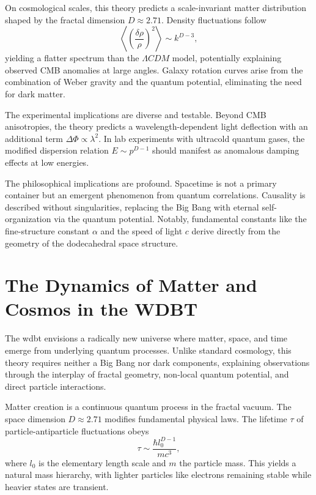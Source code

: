 On cosmological scales, this theory predicts a scale-invariant matter distribution shaped by the fractal dimension $D \approx 2.71$. Density fluctuations follow
\begin{equation}
    \left\langle \left( \frac{\delta \rho}{\rho} \right)^2 \right\rangle \sim k^{D-3},
\end{equation}
yielding a flatter spectrum than the $\varLambda CDM$ model, potentially explaining observed CMB anomalies at large angles. Galaxy rotation curves arise from the combination of Weber gravity and the quantum potential, eliminating the need for dark matter.

The experimental implications are diverse and testable. Beyond CMB anisotropies, the theory predicts a wavelength-dependent light deflection with an additional term $\Delta \Phi \propto \lambda^{2}$. In lab experiments with ultracold quantum gases, the modified dispersion relation $E \sim p^{D-1}$ should manifest as anomalous damping effects at low energies.

The philosophical implications are profound. Spacetime is not a primary container but an emergent phenomenon from quantum correlations. Causality is described without singularities, replacing the Big Bang with eternal self-organization via the quantum potential. Notably, fundamental constants like the fine-structure constant $\alpha$ and the speed of light $c$ derive directly from the geometry of the dodecahedral space structure.

\section{The Dynamics of Matter and Cosmos in the WDBT}
The \gls{wdbt} envisions a radically new universe where matter, space, and time emerge from underlying quantum processes. Unlike standard cosmology, this theory requires neither a Big Bang nor dark components, explaining observations through the interplay of fractal geometry, non-local quantum potential, and direct particle interactions.

Matter creation is a continuous quantum process in the fractal vacuum. The space dimension $D \approx 2.71$ modifies fundamental physical laws. The lifetime $\tau$ of particle-antiparticle fluctuations obeys
\begin{equation}
    \tau \sim \frac{\hbar l_0^{D-1}}{mc^3},
\end{equation}
where $l_0$ is the elementary length scale and $m$ the particle mass. This yields a natural mass hierarchy, with lighter particles like electrons remaining stable while heavier states are transient.

